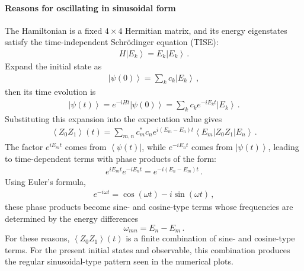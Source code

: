 \documentclass[11pt]{article}
\numberwithin{equation}{section}
\newcommand{\bra}[1]{\left\langle #1 \right|} %
\newcommand{\ket}[1]{\left| #1 \right\rangle} %
\newcommand{\ev}[1]{\left\langle #1 \right\rangle} %
\begin{document}
\paragraph{Reasons for oscillating in sinusoidal form}
The Hamiltonian is a fixed $4 \times 4$ Hermitian matrix, and its energy eigenstates satisfy the time-independent Schrödinger equation (TISE):
\begin{align}
  H\ket{E_k}=E_k\ket{E_k} \,. \label{TISE}
\end{align}
Expand the initial state as
\begin{align*}
  \ket{\psi(0)}=\sum_k c_k\ket{E_k} \,,
\end{align*}
then its time evolution is
\begin{align*}
  \ket{\psi(t)} = e^{-iHt} \ket{\psi(0)} = \sum_k c_k e^{-iE_kt} \ket{E_k} \,.
\end{align*}
Substituting this expansion into the expectation value gives
\begin{align*}
  \ev{Z_0Z_1}(t) = \sum_{m,n} c_m^* c_n e^{i(E_m-E_n)t}
  \bra{E_m} Z_0Z_1 \ket{E_n} \,.
\end{align*}
The factor $e^{iE_mt}$ comes from $\bra{\psi(t)}$, while $e^{-iE_nt}$ comes from $\ket{\psi(t)}$, leading to time-dependent terms with phase products of the form:
\begin{align*}
  e^{i E_m t} e^{-i E_n t} = e^{-i(E_n-E_m)t} \,.
\end{align*}
Using Euler's formula,
\begin{align*}
  e^{-i\omega t} = \cos(\omega t) - i\sin(\omega t)\,,
\end{align*}
these phase products become sine- and cosine-type terms whose frequencies are determined by the energy differences
$$\omega_{mn} = E_n - E_m \,.$$
For these reasons, $\ev{Z_0Z_1}(t)$ is a finite combination of sine- and cosine-type terms. For the present initial states and observable, this combination produces the regular sinusoidal-type pattern seen in the numerical plots.
\end{document}
